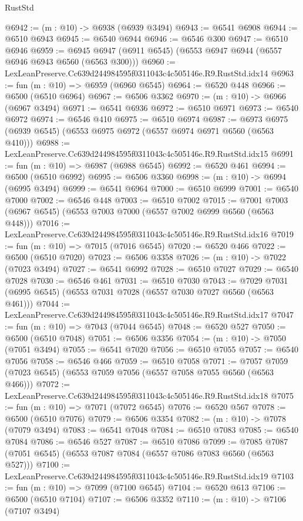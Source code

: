 \begin{lexlean}{RustStd}
\begin{coremodule}
@6942 := (m : @10) -> @6938 (@6939 @3494)
@6943 := @6541 @6908
@6944 := @6510 @6943
@6945 := @6540 @6944
@6946 := @6546 @300
@6947 := @6510 @6946
@6959 := @6945 @6947 (@6911 @6545) (@6553 @6947 @6944 (@6557 @6946 @6943 @6560 (@6563 @300)))
@6960 := LexLeanPreserve.Cc639d244984595f0311043c4c505146e.R9.RustStd.idx14
@6963 := fun (m : @10) => @6959 (@6960 @6545)
@6964 := @6520 @448
@6966 := @6500 (@6510 @6964)
@6967 := @6506 @3362
@6970 := (m : @10) -> @6966 (@6967 @3494)
@6971 := @6541 @6936
@6972 := @6510 @6971
@6973 := @6540 @6972
@6974 := @6546 @410
@6975 := @6510 @6974
@6987 := @6973 @6975 (@6939 @6545) (@6553 @6975 @6972 (@6557 @6974 @6971 @6560 (@6563 @410)))
@6988 := LexLeanPreserve.Cc639d244984595f0311043c4c505146e.R9.RustStd.idx15
@6991 := fun (m : @10) => @6987 (@6988 @6545)
@6992 := @6520 @461
@6994 := @6500 (@6510 @6992)
@6995 := @6506 @3360
@6998 := (m : @10) -> @6994 (@6995 @3494)
@6999 := @6541 @6964
@7000 := @6510 @6999
@7001 := @6540 @7000
@7002 := @6546 @448
@7003 := @6510 @7002
@7015 := @7001 @7003 (@6967 @6545) (@6553 @7003 @7000 (@6557 @7002 @6999 @6560 (@6563 @448)))
@7016 := LexLeanPreserve.Cc639d244984595f0311043c4c505146e.R9.RustStd.idx16
@7019 := fun (m : @10) => @7015 (@7016 @6545)
@7020 := @6520 @466
@7022 := @6500 (@6510 @7020)
@7023 := @6506 @3358
@7026 := (m : @10) -> @7022 (@7023 @3494)
@7027 := @6541 @6992
@7028 := @6510 @7027
@7029 := @6540 @7028
@7030 := @6546 @461
@7031 := @6510 @7030
@7043 := @7029 @7031 (@6995 @6545) (@6553 @7031 @7028 (@6557 @7030 @7027 @6560 (@6563 @461)))
@7044 := LexLeanPreserve.Cc639d244984595f0311043c4c505146e.R9.RustStd.idx17
@7047 := fun (m : @10) => @7043 (@7044 @6545)
@7048 := @6520 @527
@7050 := @6500 (@6510 @7048)
@7051 := @6506 @3356
@7054 := (m : @10) -> @7050 (@7051 @3494)
@7055 := @6541 @7020
@7056 := @6510 @7055
@7057 := @6540 @7056
@7058 := @6546 @466
@7059 := @6510 @7058
@7071 := @7057 @7059 (@7023 @6545) (@6553 @7059 @7056 (@6557 @7058 @7055 @6560 (@6563 @466)))
@7072 := LexLeanPreserve.Cc639d244984595f0311043c4c505146e.R9.RustStd.idx18
@7075 := fun (m : @10) => @7071 (@7072 @6545)
@7076 := @6520 @567
@7078 := @6500 (@6510 @7076)
@7079 := @6506 @3354
@7082 := (m : @10) -> @7078 (@7079 @3494)
@7083 := @6541 @7048
@7084 := @6510 @7083
@7085 := @6540 @7084
@7086 := @6546 @527
@7087 := @6510 @7086
@7099 := @7085 @7087 (@7051 @6545) (@6553 @7087 @7084 (@6557 @7086 @7083 @6560 (@6563 @527)))
@7100 := LexLeanPreserve.Cc639d244984595f0311043c4c505146e.R9.RustStd.idx19
@7103 := fun (m : @10) => @7099 (@7100 @6545)
@7104 := @6520 @613
@7106 := @6500 (@6510 @7104)
@7107 := @6506 @3352
@7110 := (m : @10) -> @7106 (@7107 @3494)

\end{coremodule}
\end{lexlean}
